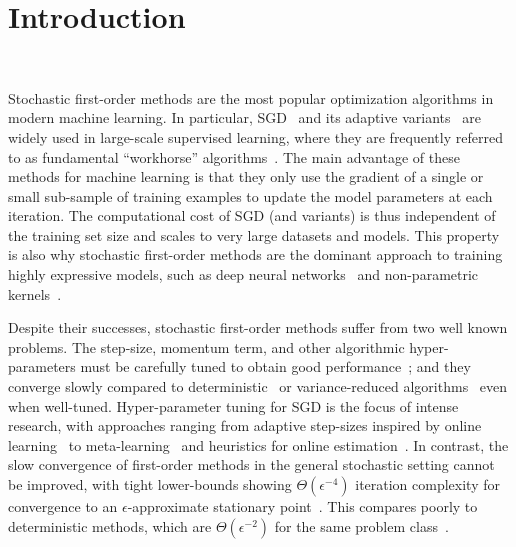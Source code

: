 
\chapter{Introduction}~\label{ch:Introduction}

Stochastic first-order methods are the most popular optimization algorithms in modern machine learning.
In particular, \ac{SGD}~\citep{robbins1951sgd} and its adaptive variants~\citep{duchi2011adagrad, tieleman2012rmsprop, zeiler2012adadelta, kingma2015adam} are widely used in large-scale supervised learning, where they are frequently referred to as fundamental ``workhorse'' algorithms~\citep{qian2019improvedrates, assran2019sgpush, grosse2015scaling}. 
The main advantage of these methods for machine learning is that they only use the gradient of a single or small sub-sample of training examples to update the model parameters at each iteration.
The computational cost of \ac{SGD} (and variants) is thus independent of the training set size and scales to very large datasets and models.
This property is also why stochastic first-order methods are the dominant approach to training highly expressive models, such as deep neural networks~\citep{zhang2017understanding, bengio2012practical} and non-parametric kernels~\citep{liang2018just, belkin2019datainterp}.

Despite their successes, stochastic first-order methods suffer from two well known problems. 
The step-size, momentum term, and other algorithmic hyper-parameters must be carefully tuned to obtain good performance~\citep{bengio2012practical, schaul2013no, li2019convergence, choi2019empirical}; and
they converge slowly compared to deterministic~\citep{nesterov2004lectures} or variance-reduced algorithms~\citep{leroux2012sag, johnson2013svrg, defazio2014saga} even when well-tuned.
Hyper-parameter tuning for \ac{SGD} is the focus of intense research, with approaches ranging from adaptive step-sizes inspired by online learning~\citep{luo2019adabound, li2019convergence, orabona2017coin} to meta-learning~\citep{baydin2018hypergradient, schraudolph1999local, sutton1992gain, almeida1998parameter, plagianakos2001learning, shao2000rates} and heuristics for online estimation~\citep{schaul2013no, rolinek2018l4, tan2016bb}.
In contrast, the slow convergence of first-order methods in the general stochastic setting cannot be improved, with tight lower-bounds showing \( \Theta(\epsilon^{-4}) \) iteration complexity for convergence to an \( \epsilon \)-approximate stationary point~\citep{drori2019complexity, arjevani2019lower}.
This compares poorly to deterministic methods, which are \( \Theta(\epsilon^{-2}) \) for the same problem class~\citep{carmon2019lower}.

